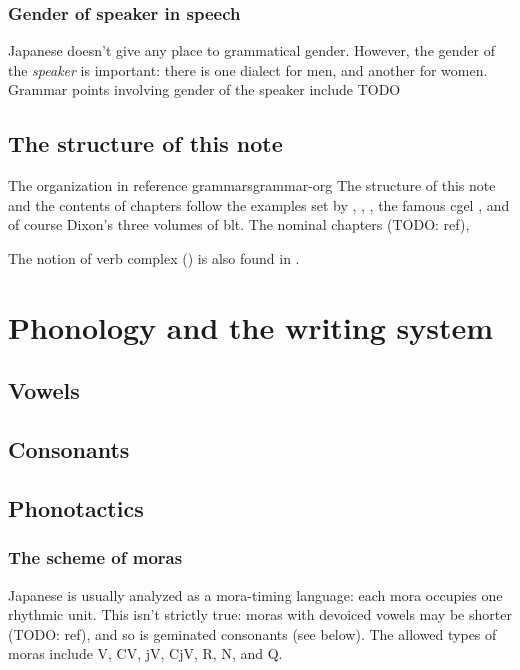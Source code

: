 \documentclass[UTF8, a4paper, oneside, scheme=plain]{ctexrep}
\begin{document}
\subsection{Gender of speaker in speech}

Japanese doesn't give any place to grammatical gender.
However, the gender of the \emph{speaker} is important:
there is one dialect for men,
and another for women.
Grammar points involving gender of the speaker include TODO

\section{The structure of this note}

\begin{theorybox}{The organization in reference grammars}{grammar-org}
    The structure of this note and the contents of chapters follow 
    the examples set by \citet{Friesen2017}, \citet{jacques2021grammar}, \citet{Grimm2021},
    the famous \acs{cgel} \citep{cgel}, and of course Dixon's three volumes of \acs{blt}.
    The nominal chapters (TODO: ref), 
    
    The notion of verb complex () is also found in 
    \citet{Friesen2017}.
\end{theorybox}

\chapter{Phonology and the writing system}

\section{Vowels}\label{sec:vowel}

\section{Consonants}\label{sec:consonant}

\section{Phonotactics}

\subsection{The scheme of moras}\label{sec:mora-scheme}

Japanese is usually analyzed as a mora-timing language:
each mora occupies one rhythmic unit.
This isn't strictly true:
moras with devoiced vowels may be shorter (TODO: ref),
and so is geminated consonants (see below).
The allowed types of moras include V, CV, jV, CjV, R, N, and Q.
\end{document}
